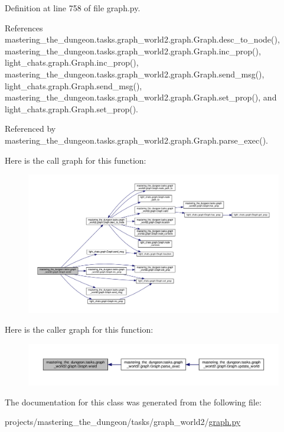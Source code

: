 Definition at line 758 of file graph.\+py.



References mastering\+\_\+the\+\_\+dungeon.\+tasks.\+graph\+\_\+world2.\+graph.\+Graph.\+desc\+\_\+to\+\_\+node(), mastering\+\_\+the\+\_\+dungeon.\+tasks.\+graph\+\_\+world2.\+graph.\+Graph.\+inc\+\_\+prop(), light\+\_\+chats.\+graph.\+Graph.\+inc\+\_\+prop(), mastering\+\_\+the\+\_\+dungeon.\+tasks.\+graph\+\_\+world2.\+graph.\+Graph.\+send\+\_\+msg(), light\+\_\+chats.\+graph.\+Graph.\+send\+\_\+msg(), mastering\+\_\+the\+\_\+dungeon.\+tasks.\+graph\+\_\+world2.\+graph.\+Graph.\+set\+\_\+prop(), and light\+\_\+chats.\+graph.\+Graph.\+set\+\_\+prop().



Referenced by mastering\+\_\+the\+\_\+dungeon.\+tasks.\+graph\+\_\+world2.\+graph.\+Graph.\+parse\+\_\+exec().

Here is the call graph for this function\+:
\nopagebreak
\begin{figure}[H]
\begin{center}
\leavevmode
\includegraphics[width=350pt]{classmastering__the__dungeon_1_1tasks_1_1graph__world2_1_1graph_1_1Graph_a7e14bcd6bc0463bb02d81e13e19ae280_cgraph}
\end{center}
\end{figure}
Here is the caller graph for this function\+:
\nopagebreak
\begin{figure}[H]
\begin{center}
\leavevmode
\includegraphics[width=350pt]{classmastering__the__dungeon_1_1tasks_1_1graph__world2_1_1graph_1_1Graph_a7e14bcd6bc0463bb02d81e13e19ae280_icgraph}
\end{center}
\end{figure}


The documentation for this class was generated from the following file\+:\begin{DoxyCompactItemize}
\item 
projects/mastering\+\_\+the\+\_\+dungeon/tasks/graph\+\_\+world2/\hyperlink{projects_2mastering__the__dungeon_2tasks_2graph__world2_2graph_8py}{graph.\+py}\end{DoxyCompactItemize}
